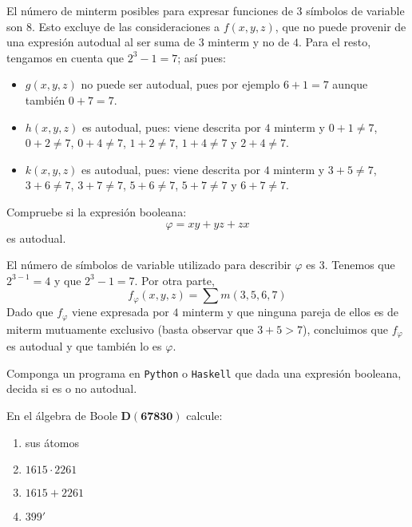 \begin{solution}
  El número de minterm posibles para expresar funciones de $3$
  símbolos de variable son $8$. Esto excluye de las consideraciones a
  $f(x,y,z)$, que no puede provenir de una expresión autodual al ser
  suma de $3$ minterm y no de $4$. Para el resto, tengamos en cuenta
  que $2^{3}-1=7$; así pues:
  \begin{itemize}
  \item $g(x,y,z)$ no puede ser autodual, pues por ejemplo $6+1=7$
    aunque también $0+7=7$.
  \item $h(x,y,z)$ es autodual, pues: viene descrita por $4$ minterm y
    $0+1\neq 7$, $0+2\neq 7$, $0+4\neq 7$, $1+2\neq 7$, $1+4\neq 7$ y
    $2+4\neq 7$.
  \item $k(x,y,z)$ es autodual, pues: viene descrita por $4$ minterm y
    $3+5\neq 7$, $3+6\neq 7$, $3+7\neq 7$, $5+6\neq 7$, $5+7\neq 7$ y
    $6+7\neq 7$.
  \end{itemize}
\end{solution}

\begin{exercise}
  Compruebe si la expresión booleana:
  \begin{equation*}
    \varphi=xy+yz+zx
  \end{equation*}
  es autodual.
\end{exercise}

\begin{solution}
  El número de símbolos de variable utilizado para describir $\varphi$
  es $3$. Tenemos que $2^{3-1}=4$ y que $2^{3}-1=7$. Por otra parte,
  \begin{equation*}
    f_{\varphi}(x,y,z)=\sum m(3,5,6,7)
  \end{equation*}
  Dado que $f_{\varphi}$ viene expresada por $4$ minterm y que ninguna
  pareja de ellos es de miterm mutuamente exclusivo (basta observar
  que $3+5>7$), concluimos que $f_{\varphi}$ es autodual y que también
  lo es $\varphi$.
\end{solution}

\begin{exercise}
  Componga un programa en \texttt{Python} o \texttt{Haskell} que dada
  una expresión booleana, decida si es o no autodual.
\end{exercise}

\begin{exercise}
  En el álgebra de Boole $\mathbf{D(67830)}$ calcule:
  \begin{enumerate}
  \item sus átomos
  \item $1615\cdot 2261$
  \item $1615+2261$
  \item $399'$
  \end{enumerate}
\end{exercise}

